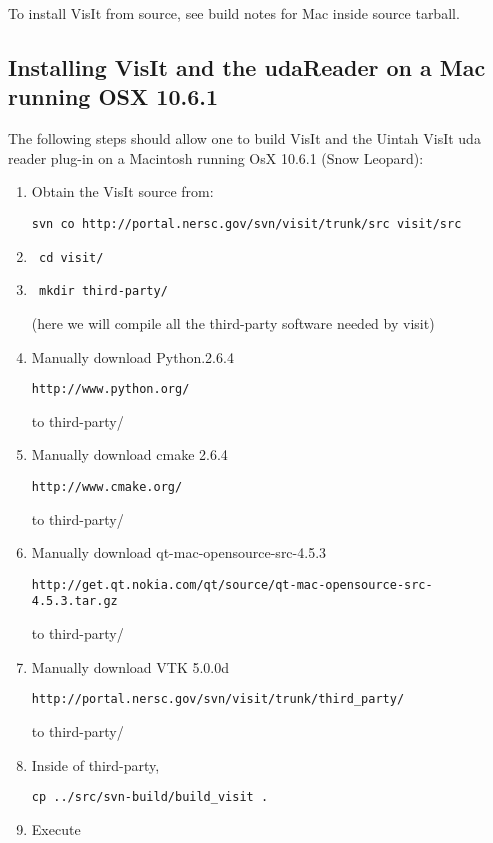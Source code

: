 \documentclass[11pt,fleqn]{book} %
\begin{document}
To install VisIt from source, see build notes for Mac inside source
tarball.

\subsection{Installing VisIt and the udaReader on a Mac running OSX 10.6.1}

The following steps should allow one to build VisIt and the Uintah VisIt uda reader plug-in on a Macintosh running OsX 10.6.1 (Snow Leopard):
%
\begin{enumerate}
\item Obtain the VisIt source from:
\begin{lstlisting}
svn co http://portal.nersc.gov/svn/visit/trunk/src visit/src
\end{lstlisting}
\item \begin{lstlisting} cd visit/ \end{lstlisting}
\item \begin{lstlisting} mkdir third-party/ \end{lstlisting} (here we will compile all the third-party software needed by visit)
\item Manually download Python.2.6.4 
\begin{lstlisting}
http://www.python.org/
\end{lstlisting}
to third-party/
\item Manually download cmake 2.6.4 
\begin{lstlisting}
http://www.cmake.org/
\end{lstlisting}
to third-party/
\item Manually download qt-mac-opensource-src-4.5.3 
\begin{lstlisting}
http://get.qt.nokia.com/qt/source/qt-mac-opensource-src-4.5.3.tar.gz
\end{lstlisting}
to third-party/
\item Manually download VTK 5.0.0d 
\begin{lstlisting}
http://portal.nersc.gov/svn/visit/trunk/third_party/
\end{lstlisting}
to third-party/
\item Inside of third-party,
\begin{lstlisting}
cp ../src/svn-build/build_visit . 
\end{lstlisting}
\item Execute
\begin{lstlisting}

\end{lstlisting}
\end{enumerate}
\end{document}
